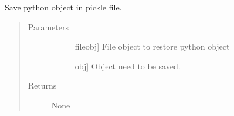 \documentclass[letterpaper,10pt,english]{sphinxmanual}
\begin{document}

\begin{fulllineitems}
\label{\detokenize{pygace:pygace.utility.save_to_pickle}}
\sphinxAtStartPar
Save python object in pickle file.
\begin{quote}\begin{description}
\item[{Parameters}] \leavevmode\begin{description}
\item[{}] \leavevmode{[}fileobj{]}
\sphinxAtStartPar
File object to restore python object

\item[{}] \leavevmode{[}obj{]}
\sphinxAtStartPar
Object need to be saved.

\end{description}

\item[{Returns}] \leavevmode\begin{description}
\item[{None}] \leavevmode
\end{description}

\end{description}\end{quote}

\end{fulllineitems}
\end{document}
